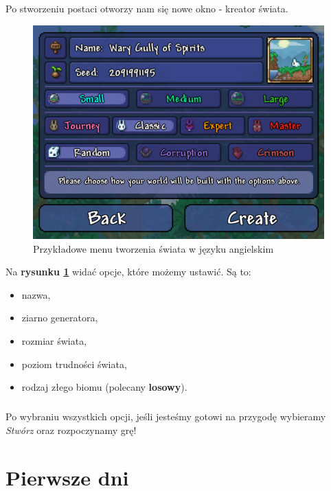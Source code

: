 \documentclass{report}
\begin{document}
\paragraph{} Po stworzeniu postaci otworzy nam się nowe okno - kreator świata. 
\begin{figure}
	\centering
	\includegraphics[scale=0.4]{createWorld}
	\caption{Przykładowe menu tworzenia świata w języku angielskim}
	\label{rys:world}
\end{figure}
Na \textbf{rysunku \ref{rys:world}} widać opcje, które możemy ustawić. Są to: 
\begin{itemize}
	\item nazwa,
	\item ziarno generatora,
	\item rozmiar świata,
	\item poziom trudności świata,
	\item rodzaj złego biomu (polecany \textbf{losowy}).
\end{itemize}
\paragraph{} Po wybraniu wszystkich opcji, jeśli jesteśmy gotowi na przygodę wybieramy \textit{Stwórz} oraz rozpoczynamy grę!
\chapter{Pierwsze dni}
\end{document}
